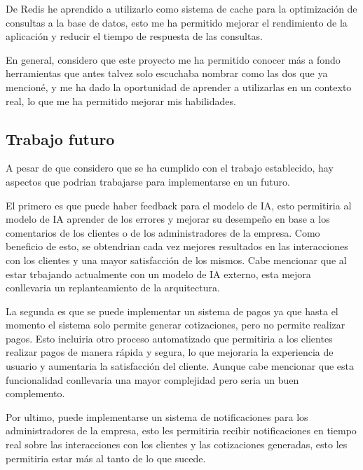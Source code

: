 De Redis he aprendido a utilizarlo como sistema de cache para la optimización de consultas a la base de datos, esto me ha permitido mejorar el rendimiento de la aplicación y reducir el tiempo de respuesta de las consultas.

En general, considero que este proyecto me ha permitido conocer más a fondo herramientas que antes talvez solo escuchaba nombrar como las dos que ya mencioné, y me ha dado la oportunidad de aprender a utilizarlas en un contexto real, lo que me ha permitido mejorar mis habilidades.

\subsection{Trabajo futuro}
\label{sec:trabajo-futuro}

A pesar de que considero que se ha cumplido con el trabajo establecido, hay aspectos que podrian trabajarse para implementarse en un futuro.

El primero es que puede haber feedback para el modelo de IA, esto permitiria al modelo de IA aprender de los errores y mejorar su desempeño en base a los comentarios de los clientes o de los administradores de la empresa. Como beneficio de esto, se obtendrian cada vez mejores resultados en las interacciones con los clientes y una mayor satisfacción de los mismos. Cabe mencionar que al estar trbajando actualmente con un modelo de IA externo, esta mejora conllevaria un replanteamiento de la arquitectura.

La segunda es que se puede implementar un sistema de pagos ya que hasta el momento el sistema solo permite generar cotizaciones, pero no permite realizar pagos. Esto incluiria otro proceso automatizado que permitiria a los clientes realizar pagos de manera rápida y segura, lo que mejoraria la experiencia de usuario y aumentaria la satisfacción del cliente. Aunque cabe mencionar que esta funcionalidad conllevaria una mayor complejidad pero seria un buen complemento.

Por ultimo, puede implementarse un sistema de notificaciones para los administradores de la empresa, esto les permitiria recibir notificaciones en tiempo real sobre las interacciones con los clientes y las cotizaciones generadas, esto les permitiria estar más al tanto de lo que sucede.